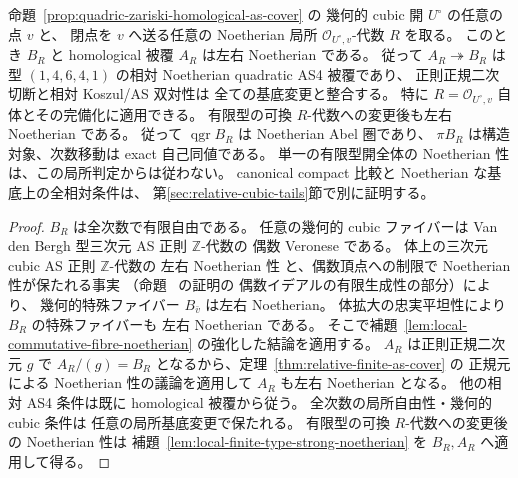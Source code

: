 \begin{corollary}
\label{cor:quadric-point-local-noetherian-as4}
命題~\ref{prop:quadric-zariski-homological-as-cover} の
幾何的 cubic 開 $U^\circ$ の任意の点 $v$ と、
閉点を $v$ へ送る任意の Noetherian 局所
$\mathcal O_{U^\circ,v}$-代数 $R$ を取る。
このとき $B_R$ と homological 被覆 $A_R$ は左右 Noetherian である。
従って $A_R\twoheadrightarrow B_R$ は
型 $(1,4,6,4,1)$ の相対 Noetherian quadratic AS4 被覆であり、
正則正規二次切断と相対 Koszul/AS 双対性は
全ての基底変更と整合する。
特に $R=\mathcal O_{U^\circ,v}$ 自体とその完備化に適用できる。
有限型の可換 $R$-代数への変更後も左右 Noetherian である。
従って $\operatorname{qgr}B_R$ は Noetherian Abel 圏であり、
$\pi B_R$ は構造対象、次数移動は exact 自己同値である。
単一の有限型開全体の Noetherian 性は、この局所判定からは従わない。
canonical compact 比較と Noetherian な基底上の全相対条件は、
第\ref{sec:relative-cubic-tails}節で別に証明する。
\end{corollary}
\begin{proof}
$B_R$ は全次数で有限自由である。
任意の幾何的 cubic ファイバーは
Van den Bergh 型三次元 AS 正則 $\mathbb Z$-代数の
偶数 Veronese である。
体上の三次元 cubic AS 正則 $\mathbb Z$-代数の
左右 Noetherian 性\cite[Corollary 5.5.9(1)]{VdB2011} と、偶数頂点への制限で
Noetherian 性が保たれる事実
（命題~\cite[\texttt{prop:weighted-even-koszul}]{QuadricIntrinsic2026} の証明の
偶数イデアルの有限生成性の部分）により、
幾何的特殊ファイバー $B_{\bar v}$ は左右 Noetherian。
体拡大の忠実平坦性により $B_R$ の特殊ファイバーも
左右 Noetherian である。
そこで補題~\ref{lem:local-commutative-fibre-noetherian}
の強化した結論を適用する。
$A_R$ は正則正規二次元 $g$ で $A_R/(g)=B_R$
となるから、定理~\ref{thm:relative-finite-as-cover} の
正規元による Noetherian 性の議論を適用して
$A_R$ も左右 Noetherian となる。
他の相対 AS4 条件は既に homological 被覆から従う。
全次数の局所自由性・幾何的 cubic 条件は
任意の局所基底変更で保たれる。
有限型の可換 $R$-代数への変更後の Noetherian 性は
補題~\ref{lem:local-finite-type-strong-noetherian}
を $B_R,A_R$ へ適用して得る。
\end{proof}




